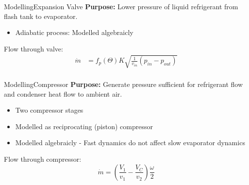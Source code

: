 \begin{frame}{Modelling}{Expansion Valve}
	\textbf{Purpose:} Lower pressure of liquid refrigerant from flash tank to evaporator.
	\begin{itemize}
		\item Adiabatic process: Modelled algebraicly
	\end{itemize}
	Flow through valve:
	\begin{equation} \label{eq:ExpansionValve_Alt}
		\begin{split}
			\dot{m} & = f_p(\Theta) K  \sqrt{\frac{1}{v_{in}} (p_{in} - p_{out})} \\
		\end{split}
	\end{equation}

\end{frame}




\begin{frame}{Modelling}{Compressor}
	\textbf{Purpose:} Generate pressure sufficient for refrigerant flow and condenser heat flow to ambient air.
	\begin{itemize}
		\item Two compressor stages
		\item Modelled as reciprocating (piston) compressor
		\item Modelled algebraicly - Fast dynamics do not affect slow evaporator dynamics
	\end{itemize}
	Flow through compressor:
	\begin{equation}
		\dot{m} = \left(\frac{V_1}{v_1} - \frac{V_C}{v_2}\right) \frac{\omega}{2} \label{eq:comp_mass_flow}
	\end{equation}
\end{frame}


